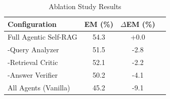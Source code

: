 
\begin{table}[h]
\centering
\caption{Ablation Study Results}
\label{tab:ablation}
\begin{tabular}{lccc}
\toprule
Configuration & EM (\%) & $\Delta$EM (\%) \\
\midrule
Full Agentic Self-RAG & 54.3 & +0.0 \\
-Query Analyzer & 51.5 & -2.8 \\
-Retrieval Critic & 52.1 & -2.2 \\
-Answer Verifier & 50.2 & -4.1 \\
All Agents (Vanilla) & 45.2 & -9.1 \\
\bottomrule
\end{tabular}
\end{table}
